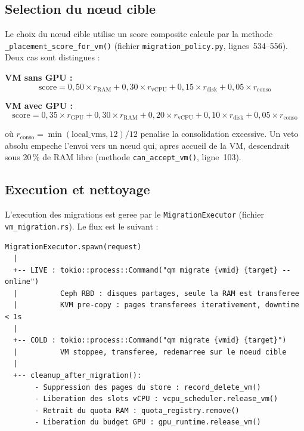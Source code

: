 \subsection{Selection du n\oe{}ud cible}
\label{subsec:selection-cible}

Le choix du n\oe{}ud cible utilise un score composite calcule par la methode \texttt{\_placement\_score\_for\_vm()} (fichier \texttt{migration\_policy.py}, lignes~534--556). Deux cas sont distingues :

\textbf{VM sans GPU :}
\begin{equation}
    \label{eq:score-sans-gpu}
    \text{score} = 0{,}50 \times r_{\text{RAM}} + 0{,}30 \times r_{\text{vCPU}} + 0{,}15 \times r_{\text{disk}} + 0{,}05 \times r_{\text{conso}}
\end{equation}

\textbf{VM avec GPU :}
\begin{equation}
    \label{eq:score-avec-gpu}
    \text{score} = 0{,}35 \times r_{\text{GPU}} + 0{,}30 \times r_{\text{RAM}} + 0{,}20 \times r_{\text{vCPU}} + 0{,}10 \times r_{\text{disk}} + 0{,}05 \times r_{\text{conso}}
\end{equation}

o\`u $r_{\text{conso}} = \min(\text{local\_vms}, 12) / 12$ penalise la consolidation excessive. Un veto absolu empeche l'envoi vers un n\oe{}ud qui, apres accueil de la VM, descendrait sous 20\,\% de RAM libre (methode \texttt{can\_accept\_vm()}, ligne~103).

\subsection{Execution et nettoyage}
\label{subsec:execution-nettoyage}

L'execution des migrations est geree par le \texttt{MigrationExecutor} (fichier \texttt{vm\_migration.rs}). Le flux est le suivant :

\begin{verbatim}
MigrationExecutor.spawn(request)
  |
  +-- LIVE : tokio::process::Command("qm migrate {vmid} {target} --online")
  |          Ceph RBD : disques partages, seule la RAM est transferee
  |          KVM pre-copy : pages transferees iterativement, downtime < 1s
  |
  +-- COLD : tokio::process::Command("qm migrate {vmid} {target}")
  |          VM stoppee, transferee, redemarree sur le noeud cible
  |
  +-- cleanup_after_migration():
       - Suppression des pages du store : record_delete_vm()
       - Liberation des slots vCPU : vcpu_scheduler.release_vm()
       - Retrait du quota RAM : quota_registry.remove()
       - Liberation du budget GPU : gpu_runtime.release_vm()
\end{verbatim}

